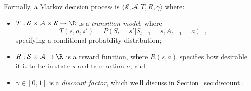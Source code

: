 Formally, a Markov decision process is $\langle \mathcal S, \mathcal A, T, R,
\gamma\rangle$ where:
\begin{itemize}
\item
$T : \mathcal S \times \mathcal A \times \mathcal S \rightarrow \R$ is
a {\em transition model}, where
\[T(s, a, s') = P(S_t = s'|S_{t - 1} = s, 
A_{t - 1} = a)\;\;,\] specifying a conditional probability distribution; 
\item
$R: \mathcal S \times \mathcal A \rightarrow \R$ is a reward function,
where $R(s, a)$ specifies how desirable it is to be in  state $s$ and
take action $a$; and  
\item $\gamma \in [0, 1]$ is a {\em discount factor}, which we'll
  discuss in Section~\ref{sec:discount}.
\end{itemize}

